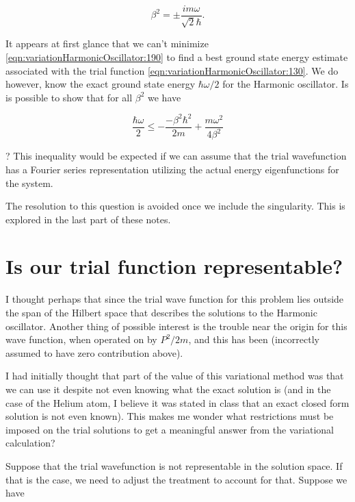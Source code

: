 \begin{equation}\label{eqn:variationHarmonicOscillator:230}
\beta^2 = \pm \frac{i m \omega}{\sqrt{2} \hbar}.
\end{equation}

It appears at first glance that we can't minimize \ref{eqn:variationHarmonicOscillator:190} to find a best ground state energy estimate associated with the trial function \ref{eqn:variationHarmonicOscillator:130}.  We do however, know the exact ground state energy $\hbar \omega/2$ for the Harmonic oscillator.  Is is possible to show that for all $\beta^2$ we have

\begin{equation}\label{eqn:variationHarmonicOscillator:250}
\frac{\hbar \omega}{2} \le -\frac{- \beta^2 \hbar^2}{2m} + \frac{m \omega^2}{4 \beta^2}
\end{equation}

?  This inequality would be expected if we can assume that the trial wavefunction has a Fourier series representation utilizing the actual energy eigenfunctions for the system.

The resolution to this question is avoided once we include the singularity.  This is explored in the last part of these notes.

\section{Is our trial function representable?}

I thought perhaps that since the trial wave function for this problem lies outside the span of the Hilbert space that describes the solutions to the Harmonic oscillator.  Another thing of possible interest is the trouble near the origin for this wave function, when operated on by $P^2/2m$, and this has been (incorrectly assumed to have zero contribution above).

I had initially thought that part of the value of this variational method was that we can use it despite not even knowing what the exact solution is (and in the case of the Helium atom, I believe it was stated in class that an exact closed form solution is not even known).  This makes me wonder what restrictions must be imposed on the trial solutions to get a meaningful answer from the variational calculation?

Suppose that the trial wavefunction is not representable in the solution space.  If that is the case, we need to adjust the treatment to account for that.  Suppose we have

